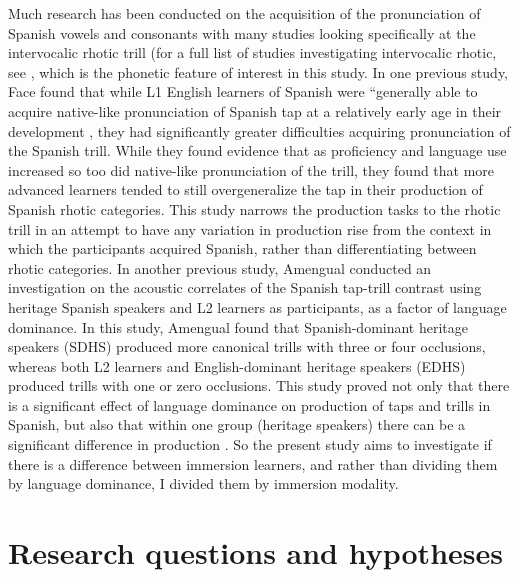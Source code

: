 \documentclass[
  a4paper,
  11pt,
  twocolumn]{article}
\begin{document}
Much research has been conducted on the acquisition of the pronunciation
of Spanish vowels and consonants with many studies looking specifically
at the intervocalic rhotic trill (for a full list of studies
investigating intervocalic rhotic, see \cite{simonet_l2_2012}, which is
the phonetic feature of interest in this study. In one previous study,
Face \cite{face_intervocalic_2006} found that while L1 English learners
of Spanish were ``generally able to acquire native-like pronunciation of
Spanish tap at a relatively early age in their development
\cite{face_intervocalic_2006}, they had significantly greater
difficulties acquiring pronunciation of the Spanish trill. While they
found evidence that as proficiency and language use increased so too did
native-like pronunciation of the trill, they found that more advanced
learners tended to still overgeneralize the tap in their production of
Spanish rhotic categories. This study narrows the production tasks to
the rhotic trill in an attempt to have any variation in production rise
from the context in which the participants acquired Spanish, rather than
differentiating between rhotic categories. In another previous study,
Amengual \cite{amengual_acoustic_2016} conducted an investigation on the
acoustic correlates of the Spanish tap-trill contrast using heritage
Spanish speakers and L2 learners as participants, as a factor of
language dominance. In this study, Amengual found that Spanish-dominant
heritage speakers (SDHS) produced more canonical trills with three or
four occlusions, whereas both L2 learners and English-dominant heritage
speakers (EDHS) produced trills with one or zero occlusions. This study
proved not only that there is a significant effect of language dominance
on production of taps and trills in Spanish, but also that within one
group (heritage speakers) there can be a significant difference in
production \cite{amengual_acoustic_2016}. So the present study aims to
investigate if there is a difference between immersion learners, and
rather than dividing them by language dominance, I divided them by
immersion modality.

\section{Research questions and hypotheses}
\end{document}
